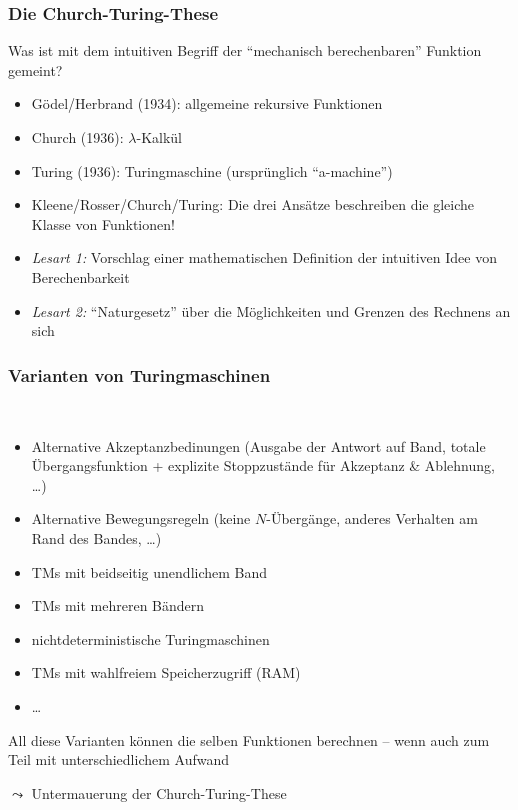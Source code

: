 \documentclass[onlymath]{beamer}
\begin{document}
\begin{frame}\frametitle{Die Church-Turing-These}

Was ist mit dem intuitiven Begriff der "`mechanisch berechenbaren"' Funktion gemeint?\pause
% 
\begin{itemize}
\item \alert{Gödel/Herbrand (1934):} allgemeine rekursive Funktionen
\item \alert{Church (1936):} $\lambda$-Kalkül
\item \alert{Turing (1936):} Turingmaschine (ursprünglich "`a-machine"')\pause
\item \alert{Kleene/Rosser/Church/Turing:} Die drei Ansätze beschreiben die gleiche Klasse von Funktionen!
\end{itemize}

\pause

\begin{itemize}
\item \emph{Lesart 1:} Vorschlag einer mathematischen Definition der intuitiven Idee von Berechenbarkeit
\item \emph{Lesart 2:} "`Naturgesetz"' über die Möglichkeiten und Grenzen des Rechnens an sich
\end{itemize}

\end{frame}

\begin{frame}\frametitle{Varianten von Turingmaschinen}

\\
\begin{itemize}
\item Alternative Akzeptanzbedinungen {\tiny(Ausgabe der Antwort auf Band, totale Übergangsfunktion + explizite Stoppzustände für Akzeptanz \& Ablehnung, \ldots)}
\item Alternative Bewegungsregeln {\tiny(keine $N$-Übergänge, anderes Verhalten am Rand des Bandes, \ldots)}
\item TMs mit beidseitig unendlichem Band
\item TMs mit mehreren Bändern
\item nichtdeterministische Turingmaschinen
\item TMs mit wahlfreiem Speicherzugriff (RAM)
\item \ldots
\end{itemize}

All diese Varianten können die selben Funktionen berechnen -- wenn auch zum Teil mit unterschiedlichem Aufwand
\medskip

$\leadsto$ Untermauerung der Church-Turing-These

\end{frame}
\end{document}
